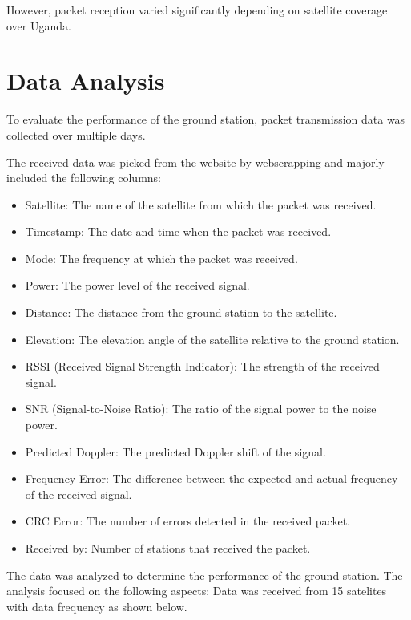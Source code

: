 \documentclass[12pt,a4paper]{article}
\begin{document}
However, packet reception varied significantly depending on satellite coverage over Uganda.

\section{Data Analysis}
To evaluate the performance of the ground station, packet transmission data was collected over multiple days. 

The received data was picked from the website by webscrapping and majorly included the following columns:
\begin{itemize}
    \item Satellite: The name of the satellite from which the packet was received.
    \item Timestamp: The date and time when the packet was received.
    \item Mode: The frequency at which the packet was received.
    \item Power: The power level of the received signal.
    \item Distance: The distance from the ground station to the satellite.
    \item Elevation: The elevation angle of the satellite relative to the ground station.
    \item RSSI (Received Signal Strength Indicator): The strength of the received signal.
    \item SNR (Signal-to-Noise Ratio): The ratio of the signal power to the noise power.
    \item Predicted Doppler: The predicted Doppler shift of the signal.
    \item Frequency Error: The difference between the expected and actual frequency of the received signal.
    \item CRC Error: The number of errors detected in the received packet.
    \item Received by: Number of stations that received the packet.
\end{itemize}
The data was analyzed to determine the performance of the ground station. The analysis focused on the following aspects:
Data was received from 15 satelites with data frequency as shown below. 
\end{document}
